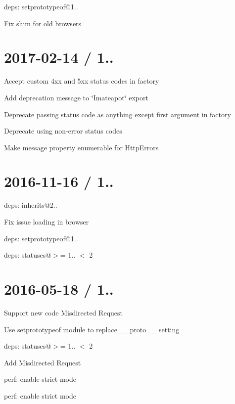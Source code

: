 
\begin{DoxyItemize}
\item deps\+: setprototypeof@1..
\begin{DoxyItemize}
\item Fix shim for old browsers
\end{DoxyItemize}
\end{DoxyItemize}

\section*{2017-\/02-\/14 / 1.. }


\begin{DoxyItemize}
\item Accept custom 4xx and 5xx status codes in factory
\item Add deprecation message to {\ttfamily \char`\"{}\+I\textquotesingle{}mateapot\char`\"{}} export
\item Deprecate passing status code as anything except first argument in factory
\item Deprecate using non-\/error status codes
\item Make {\ttfamily message} property enumerable for {\ttfamily Http\+Error}s
\end{DoxyItemize}

\section*{2016-\/11-\/16 / 1.. }


\begin{DoxyItemize}
\item deps\+: inherits@2..
\begin{DoxyItemize}
\item Fix issue loading in browser
\end{DoxyItemize}
\item deps\+: setprototypeof@1..
\item deps\+: statuses@\textquotesingle{}$>$= 1.. $<$ 2\textquotesingle{}
\end{DoxyItemize}

\section*{2016-\/05-\/18 / 1.. }


\begin{DoxyItemize}
\item Support new code { Misdirected Request}
\item Use {\ttfamily setprototypeof} module to replace {\ttfamily \+\_\+\+\_\+proto\+\_\+\+\_\+} setting
\item deps\+: statuses@\textquotesingle{}$>$= 1.. $<$ 2\textquotesingle{}
\begin{DoxyItemize}
\item Add { Misdirected Request}
\item perf\+: enable strict mode
\end{DoxyItemize}
\item perf\+: enable strict mode
\end{DoxyItemize}

